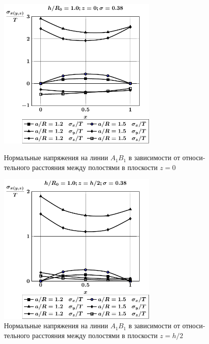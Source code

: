 \begin{russian}
\begin{figure}[h!]
\centering\footnotesize
\parbox[b]{7.5cm}{\centering\includegraphics[width=7.8cm]{cav31-a-h10-r10-z0-a1b1.pdf}
\caption{Нормальные напряжения на линии $A_1B_1$ в зависимости от относительного расстояния между полостями в плоскости $z=0$
\label{f:7:136}}}\hfil\hfil
\parbox[b]{7.5cm}{\centering\includegraphics[width=7.8cm]{cav31-a-h10-r10-z1-a1b1.pdf}
\caption{Нормальные напряжения на линии $A_1B_1$ в зависимости от относительного расстояния между полостями в плоскости $z=h/2$
\label{f:7:137}}}
\end{figure}


\end{russian}
